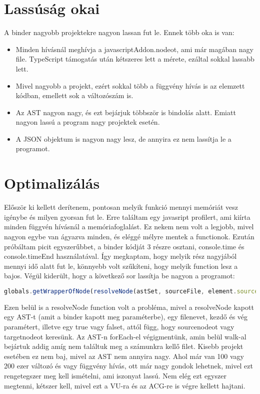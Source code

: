 \section{Lassúság okai}

A binder nagyobb projektekre nagyon lassan fut le. Ennek több oka is van:
\begin{itemize}
      \item Minden hívásnál meghívja a javascriptAddon.nodeot, ami már magában nagy file. TypeScript támogatás után kétszeres lett a mérete, ezáltal sokkal lassabb lett.
      \item Mivel nagyobb a projekt, ezért sokkal több a függvény hívás is az elemzett kódban, emellett sok a változószám is.
      \item Az AST nagyon nagy, és ezt bejárjuk többször is bindolás alatt. Emiatt nagyon lassú a program nagy projektek esetén.
      \item A JSON objektum is nagyon nagy lesz, de annyira ez nem lassítja le a programot.
\end{itemize}

\section{Optimalizálás}

\noindent

Először ki kellett derítenem, pontosan melyik funkció mennyi memóriát vesz igénybe és milyen gyorsan fut le.
Erre találtam egy javasript profilert, ami kiírta minden függvén hívásnál a memóriafoglalást.
Ez nekem nem volt a legjobb, mivel nagyon egybe van ágyazva minden, és eléggé mélyre mentek a functionok.
Ezután próbáltam picit egyszerűbbet, a binder kódját 3 részre osztani, console.time és console.timeEnd használatával.
Így megkaptam, hogy melyik rész nagyjából mennyi idő alatt fut le, könnyebb volt szűkíteni, hogy melyik function lesz a bajos.
Végül kiderült, hogy a következő sor lassítja be nagyon a programot:
\begin{lstlisting}[caption={Problémás function}, label={lst:binder_problemas_function}, language={JavaScript}]
globals.getWrapperOfNode(resolveNode(astSet, sourceFile, element.source.range.start, element.source.range.end, true));
\end{lstlisting}

Ezen belül is a resolveNode function volt a probléma, mivel a resolveNode kapott egy AST-t (amit a binder kapott meg paraméterbe), egy filenevet, kezdő és vég paramétert, illetve egy true vagy falset, attól függ, hogy sourcenodeot vagy targetnodeot keresünk.
Az AST-n forEach-el végigmentünk, amin belül walk-al bejártuk addig amíg nem találtuk meg a számunkra kellő filet.
Kisebb projekt esetében ez nem baj, mivel az AST nem annyira nagy. Ahol már van 100 vagy 200 ezer változó és vagy függvény hívás, ott már nagy gondok lehetnek, mivel ezt rengetegszer meg kell ismételni, ami iszonyat lassú.
Nem elég ezt egyszer megtenni, kétszer kell, mivel ezt a VU-ra és az ACG-re is végre kellett hajtani.

